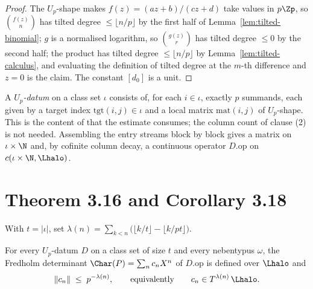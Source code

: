 \begin{proof}
  \leanok
  The $U_p$-shape makes $f(z) = (az+b)/(cz+d)$ take values in $p\Zp$, so
  $\binom{f(z)}{n}$ has tilted degree $\leq\lfloor n/p\rfloor$ by the first half of
  Lemma~\ref{lem:tilted-binomial}; $g$ is a normalised logarithm, so $\binom{g(z)}{r}$ has tilted
  degree $\leq 0$ by the second half; the product has tilted degree
  $\leq \lfloor n/p\rfloor$ by Lemma~\ref{lem:tilted-calculus}, and evaluating the definition of
  tilted degree at the $m$-th difference and $z=0$ is the claim.  The constant $[d_0]$ is a unit.
\end{proof}

\begin{definition}
  \label{def:updatum}
  \leanok
  A \emph{$U_p$-datum} on a class set $\iota$ consists of, for each $i\in\iota$, exactly $p$
  summands, each given by a target index $\mathrm{tgt}(i,j)\in\iota$ and a local matrix
  $\mathrm{mat}(i,j)$ of $U_p$-shape.  This is the content of \cite[Proposition 3.1]{LWX} that
  the estimate consumes; the column count of clause (2) is not needed.  Assembling the entry
  streams block by block gives a matrix on $\iota\times\N$ and, by cofinite column decay, a
  continuous operator $D.\mathrm{op}$ on $c(\iota\times\N, \Lhalo)$.
\end{definition}

\section{Theorem 3.16 and Corollary 3.18}

\begin{definition}
  \label{def:lwxlambda}
  \leanok
  With $t = \lvert\iota\rvert$, set
  $\lambda(n) = \sum_{k<n}\bigl(\lfloor k/t\rfloor - \lfloor k/pt\rfloor\bigr)$.
\end{definition}

\begin{theorem}
  \label{thm:lwx316}
  \leanok
  For every $U_p$-datum $D$ on a class set of size $t$ and every nebentypus $\omega$, the
  Fredholm determinant $\Char(P) = \sum_n c_n X^n$ of $D.\mathrm{op}$ is defined over $\Lhalo$
  and
  \[
    \lVert c_n\rVert \;\leq\; p^{-\lambda(n)},
    \qquad\text{equivalently}\qquad
    c_n \in T^{\lambda(n)}\,\Lhalo .
  \]
\end{theorem}

